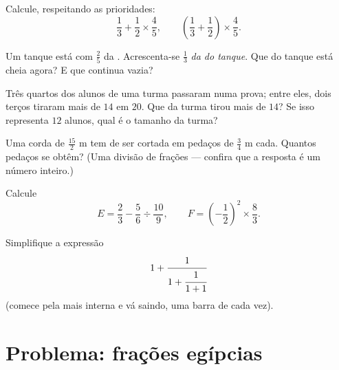 \begin{exercise}[$\star$]\label{exo:g8:fractions:7}
Calcule, respeitando as prioridades:
\[
\frac{1}{3} + \frac{1}{2} \times \frac{4}{5},
\qquad
\left(\frac{1}{3} + \frac{1}{2}\right) \times \frac{4}{5} .
\]
\end{exercise}

\begin{exercise}[$\star\star$]\label{exo:g8:fractions:8}
Um tanque está com $\frac{2}{5}$ da . Acrescenta-se
$\frac{1}{3}$ \emph{da  do tanque}. Que  do tanque
está cheia agora? E que  continua vazia?
\end{exercise}

\begin{exercise}[$\star\star$]\label{exo:g8:fractions:9}
Três quartos dos alunos de uma turma passaram numa prova; entre eles,
dois terços tiraram mais de $14$ em $20$. Que  da turma tirou
mais de $14$? Se isso representa $12$ alunos, qual é o tamanho da
turma?
\end{exercise}

\begin{exercise}[$\star\star$]\label{exo:g8:fractions:10}
Uma corda de $\frac{15}{2}$ m tem de ser cortada em pedaços de
$\frac{3}{4}$ m cada. Quantos pedaços se obtêm? (Uma divisão de
frações --- confira que a resposta é um número inteiro.)
\end{exercise}

\begin{exercise}[$\star\star$]\label{exo:g8:fractions:11}
Calcule
\[
E = \frac{2}{3} - \frac{5}{6} \div \frac{10}{9},
\qquad
F = \left(-\frac{1}{2}\right)^2 \times \frac{8}{3} .
\]
\end{exercise}

\begin{exercise}[$\star\star\star$]\label{exo:g8:fractions:12}
Simplifique a expressão
\[
1 + \cfrac{1}{1 + \cfrac{1}{1 + 1}}
\]
(comece pela  mais interna e vá saindo, uma barra de cada vez).
\end{exercise}

\section{Problema: frações egípcias}

